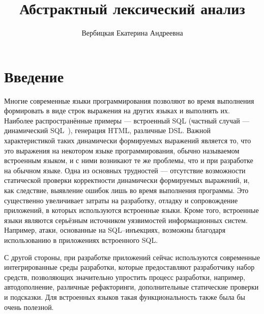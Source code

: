 \title{Абстрактный лексический анализ}
%
\author{Вербицкая Екатерина Андреевна}
%
%
%

\maketitle              %

\begin{abstract}
\end{abstract}
%


\section*{Введение}
Многие современные языки программирования позволяют во время выполнения
формировать в виде строк выражения на других языках и выполнять их. Наиболее 
распространённые примеры --- встроенный SQL (частный случай --- динамический SQL~\cite{ISO}),
генерация HTML, различные DSL. Важной характеристикой таких динамически 
формируемых выражений является то, что это выражения на некотором языке 
программирования, обычно называемом встроенным языком, и с ними возникают те же
проблемы, что и при разработке на обычном языке. Одна из основных трудностей --- 
отсутствие возможности статической проверки корректности динамически формируемых
выражений, и, как следствие, выявление ошибок лишь во время выполнения
программы. Это существенно увеличивает затраты на разработку, отладку и 
сопровождение приложений, в которых используются встроенные языки. Кроме того, 
встроенные языки являются серьёзным источником уязвимостей информационных 
систем. Например, атаки, основанные на SQL--инъекциях, возможны благодаря 
использованию в приложениях встроенного SQL.

С другой стороны, при разработке приложений сейчас используются современные 
интегрированные среды разработки, которые предоставляют разработчику набор 
средств, позволяющих значительно упростить процесс разработки, 
например, автодополнение, различные рефакторинги, дополнительные статические 
проверки и подсказки. Для встроенных языков такая функциональность также была 
бы очень полезной.

